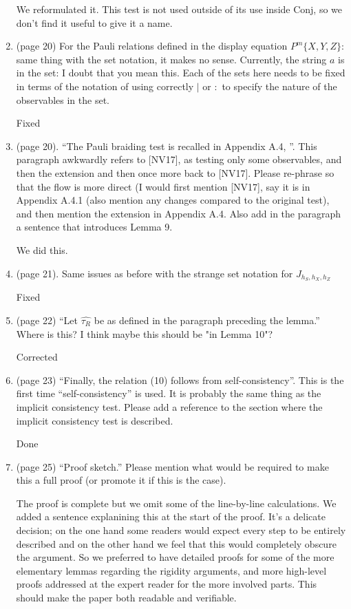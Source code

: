 \documentclass[12pt]{article}
\begin{document}
\begin{enumerate}
	{\color{blue} We reformulated it. This test is not used outside of its use inside Conj, so we don't find it useful to give it a name.} 
		
   \item (page 20) For the Pauli relations defined in the display equation $P^m\{X,Y,Z\}$: same thing with the set notation, it makes no sense. Currently, the string $a$ is in the set: I doubt that you mean this. Each of the sets here needs to be fixed in terms of the notation of using correctly $\mid$ or $:$ to specify the nature of the observables in the set.
	
	{\color{blue} Fixed}
	
    \item (page 20). ``The Pauli braiding test is recalled in Appendix A.4, ''. This paragraph awkwardly refers to [NV17], as testing only some observables, and then the extension and then once more back to [NV17]. Please re-phrase so that the flow is more direct (I would first mention [NV17], say it is in Appendix A.4.1 (also mention any changes compared to the original test), and then mention the extension in Appendix A.4. Also add in the paragraph a sentence that introduces Lemma 9.
		
			{\color{blue} We did this.}

     \item (page 21). Same issues as before with the strange set notation for $J_{h_S, h_X, h_Z}$
		
			{\color{blue} Fixed}

\item (page 22) ``Let $\hat{\tau_R}$ be as defined in the paragraph preceding the lemma.'' Where is this? I think maybe this should be "in Lemma 10"?

			{\color{blue} Corrected}

\item (page 23) ``Finally, the relation (10) follows from self-consistency''. This is the first time ``self-consistency'' is used. It is probably the same thing as the implicit consistency test. Please add a reference to the section where the implicit consistency test is described.

			{\color{blue} Done}

 \item (page 25) ``Proof sketch.'' Please mention what would be required to make this a full proof (or promote it if this is the case).

  {\color{blue} The proof is complete but we omit some of the line-by-line calculations. We added a sentence explanining this at the start of the proof. It's a delicate decision; on the one hand some readers would expect every step to be entirely described and on the other hand we feel that this would completely obscure the argument. So we preferred to have detailed proofs for some of the more elementary lemmas regarding the rigidity arguments, and more high-level proofs addressed at the expert reader for the more involved parts. This should make the paper both readable and verifiable.}
	

\end{enumerate}
\end{document}
